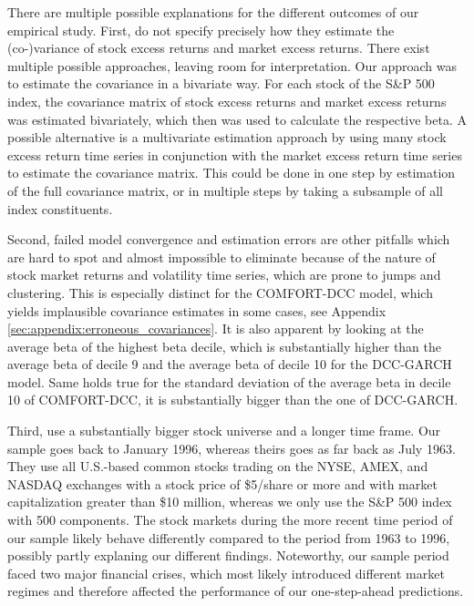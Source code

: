 \documentclass[11pt,a4paper]{article}
\def \indexName {S\&P 500}
\def \periodFrom {January 1996}
\begin{document}
There are multiple possible explanations for the different outcomes of our empirical study. First,  do not specify precisely how they estimate the (co-)variance of stock excess returns and market excess returns. There exist multiple possible approaches, leaving room for interpretation. Our approach was to estimate the covariance in a bivariate way. For each stock of the \indexName{} index, the covariance matrix of stock excess returns and market excess returns was estimated bivariately, which then was used to calculate the respective beta. A possible alternative is a multivariate estimation approach by using many stock excess return time series in conjunction with the market excess return time series to estimate the covariance matrix. This could be done in one step by estimation of the full covariance matrix, or in multiple steps by taking a subsample of all index constituents.

\noindent
Second, failed model convergence and estimation errors are other pitfalls which are hard to spot and almost impossible to eliminate because of the nature of stock market returns and volatility time series, which are prone to jumps and clustering. This is especially distinct for the COMFORT-DCC model, which yields implausible covariance estimates in some cases, see Appendix \ref{sec:appendix:erroneous_covariances}. It is also apparent by looking at the average beta of the highest beta decile, which is substantially higher than the average beta of decile 9 and the average beta of decile 10 for the DCC-GARCH model. Same holds true for the standard deviation of the average beta in decile 10 of COMFORT-DCC, it is substantially bigger than the one of DCC-GARCH.

\noindent
Third,  use a substantially bigger stock universe and a longer time frame. Our sample goes back to \periodFrom{}, whereas theirs goes as far back as July 1963. They use all U.S.-based common stocks trading on the NYSE, AMEX, and NASDAQ exchanges with a stock price of \$5/share or more and with market capitalization greater than \$10 million, whereas we only use the \indexName{} index with 500 components. The stock markets during the more recent time period of our sample likely behave differently compared to the period from 1963 to 1996, possibly partly explaning our different findings. Noteworthy, our sample period faced two major financial crises, which most likely introduced different market regimes and therefore affected the performance of our one-step-ahead predictions.
\end{document}
